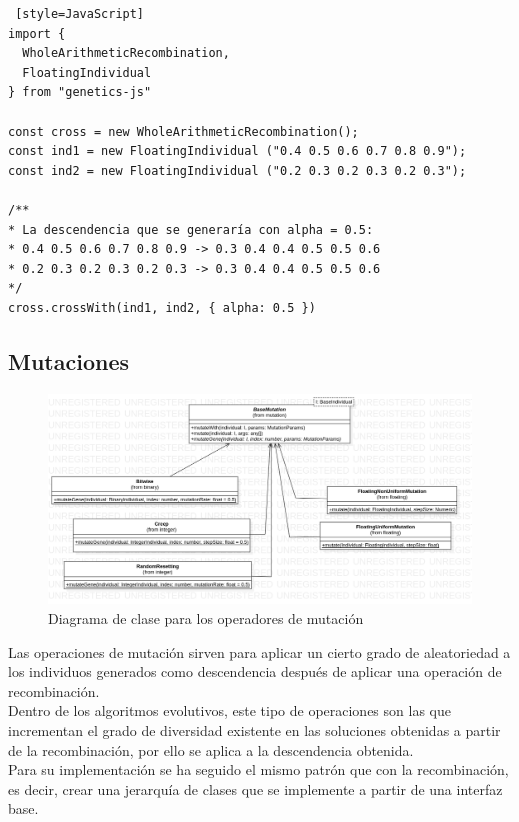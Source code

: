 \begin{lstlisting} [style=JavaScript]
import { 
  WholeArithmeticRecombination, 
  FloatingIndividual 
} from "genetics-js"

const cross = new WholeArithmeticRecombination();
const ind1 = new FloatingIndividual ("0.4 0.5 0.6 0.7 0.8 0.9");
const ind2 = new FloatingIndividual ("0.2 0.3 0.2 0.3 0.2 0.3");

/**
* La descendencia que se generaría con alpha = 0.5:
* 0.4 0.5 0.6 0.7 0.8 0.9 -> 0.3 0.4 0.4 0.5 0.5 0.6
* 0.2 0.3 0.2 0.3 0.2 0.3 -> 0.3 0.4 0.4 0.5 0.5 0.6
*/
cross.crossWith(ind1, ind2, { alpha: 0.5 })
\end{lstlisting}

\subsection{Mutaciones}

\begin{figure}[ht]
    \centering
    \includegraphics[scale=0.3]{mem/images/cap-4/4.2.7(Mutation)/Mutation.png}
    \caption{Diagrama de clase para los operadores de mutación }
    \label{fig:my_label}
\end{figure}

Las operaciones de mutación sirven para aplicar un cierto grado de aleatoriedad a los individuos generados como descendencia después de aplicar una operación de recombinación. \\

Dentro de los algoritmos evolutivos, este tipo de operaciones son las que incrementan el grado de diversidad existente en las soluciones obtenidas a partir de la recombinación, por ello se aplica a la descendencia obtenida. \\

Para su implementación se ha seguido el mismo patrón que con la recombinación, es decir, crear una jerarquía de clases que se implemente a partir de una interfaz base.

